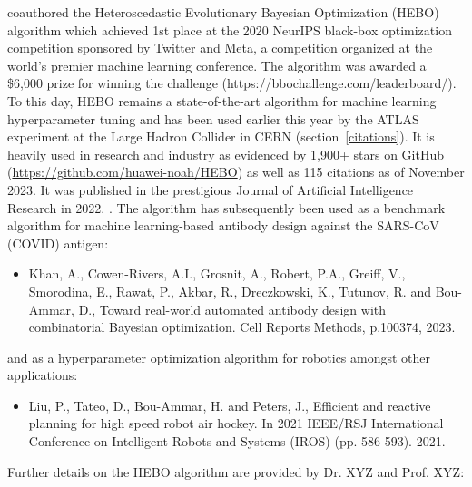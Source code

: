 \documentclass[11pt]{article}
\begin{document}
\dr coauthored the Heteroscedastic Evolutionary Bayesian Optimization (HEBO) algorithm which achieved 1st place at the 2020 NeurIPS black-box optimization competition sponsored by Twitter and Meta, a competition organized at the world's premier machine learning conference. The algorithm was awarded a \$6,000 prize for winning the challenge (https://bbochallenge.com/leaderboard/). To this day, HEBO remains a state-of-the-art algorithm for machine learning hyperparameter tuning and has been used earlier this year by the ATLAS experiment at the Large Hadron Collider in CERN (section~\ref{citations}). It is heavily used in research and industry as evidenced by 1,900+ stars on GitHub (\url{https://github.com/huawei-noah/HEBO}) as well as 115 citations as of November 2023. It was published in the prestigious Journal of Artificial Intelligence Research in 2022. \cite{hebo}. The algorithm has subsequently been used as a benchmark algorithm for machine learning-based antibody design against the SARS-CoV (COVID) antigen:

\begin{itemize}
    \item Khan, A., Cowen-Rivers, A.I., Grosnit, A., Robert, P.A., Greiff, V., Smorodina, E., Rawat, P., Akbar, R., Dreczkowski, K., Tutunov, R. and Bou-Ammar, D., Toward real-world automated antibody design with combinatorial Bayesian optimization. Cell Reports Methods, p.100374, 2023.
\end{itemize}

and as a hyperparameter optimization algorithm for robotics amongst other applications:

\begin{itemize}
    \item Liu, P., Tateo, D., Bou-Ammar, H. and Peters, J., Efficient and reactive planning for high speed robot air hockey. In 2021 IEEE/RSJ International Conference on Intelligent Robots and Systems (IROS) (pp. 586-593). 2021.
\end{itemize}

Further details on the HEBO algorithm are provided by Dr. XYZ and Prof. XYZ:\\\\


 \\\\\bw 
\end{document}
